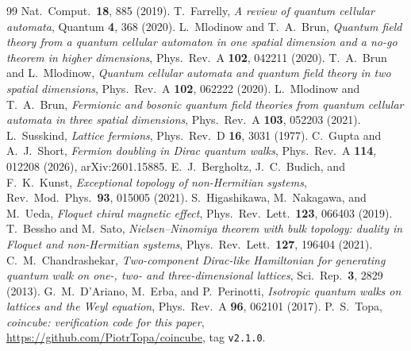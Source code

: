 \documentclass[aps,prd,twocolumn,superscriptaddress,nofootinbib,floatfix]{revtex4-2}
\begin{document}
\begin{thebibliography}{99}
Nat.\ Comput.\ \textbf{18}, 885 (2019).
 T.~Farrelly,
\emph{A review of quantum cellular automata},
Quantum \textbf{4}, 368 (2020).
 L.~Mlodinow and T.~A.~Brun,
\emph{Quantum field theory from a quantum cellular automaton in one
spatial dimension and a no-go theorem in higher dimensions},
Phys.\ Rev.\ A \textbf{102}, 042211 (2020).
 T.~A.~Brun and L.~Mlodinow,
\emph{Quantum cellular automata and quantum field theory in two spatial
dimensions}, Phys.\ Rev.\ A \textbf{102}, 062222 (2020).
 L.~Mlodinow and T.~A.~Brun,
\emph{Fermionic and bosonic quantum field theories from quantum cellular
automata in three spatial dimensions},
Phys.\ Rev.\ A \textbf{103}, 052203 (2021).
 L.~Susskind,
\emph{Lattice fermions}, Phys.\ Rev.\ D \textbf{16}, 3031 (1977).
 C.~Gupta and A.~J.~Short,
\emph{Fermion doubling in Dirac quantum walks},
Phys.\ Rev.\ A \textbf{114}, 012208 (2026), arXiv:2601.15885.
 E.~J.~Bergholtz, J.~C.~Budich, and F.~K.~Kunst,
\emph{Exceptional topology of non-Hermitian systems},
Rev.\ Mod.\ Phys.\ \textbf{93}, 015005 (2021).
 S.~Higashikawa, M.~Nakagawa, and M.~Ueda,
\emph{Floquet chiral magnetic effect},
Phys.\ Rev.\ Lett.\ \textbf{123}, 066403 (2019).
 T.~Bessho and M.~Sato,
\emph{Nielsen--Ninomiya theorem with bulk topology: duality in Floquet
and non-Hermitian systems},
Phys.\ Rev.\ Lett.\ \textbf{127}, 196404 (2021).
 C.~M.~Chandrashekar,
\emph{Two-component Dirac-like Hamiltonian for generating quantum walk
on one-, two- and three-dimensional lattices},
Sci.\ Rep.\ \textbf{3}, 2829 (2013).
 G.~M.~D'Ariano, M.~Erba, and P.~Perinotti,
\emph{Isotropic quantum walks on lattices and the Weyl equation},
Phys.\ Rev.\ A \textbf{96}, 062101 (2017).
 P.~S.~Topa, \emph{coincube: verification code for this
paper}, \url{https://github.com/PiotrTopa/coincube}, tag \texttt{v2.1.0}.
\end{thebibliography}
\end{document}
